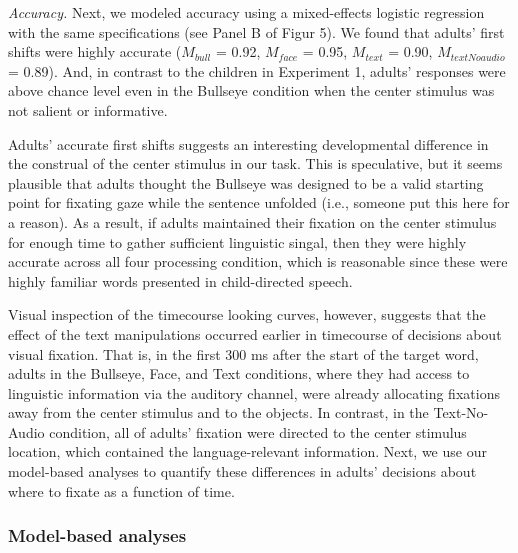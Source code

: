 \documentclass[english,floatsintext,man]{apa6}
\begin{document}
\emph{Accuracy.} Next, we modeled accuracy using a mixed-effects
logistic regression with the same specifications (see Panel B of Figur
5). We found that adults' first shifts were highly accurate
(\(M_{bull}\) = 0.92, \(M_{face}\) = 0.95, \(M_{text}\) = 0.90,
\(M_{textNoaudio}\) = 0.89). And, in contrast to the children in
Experiment 1, adults' responses were above chance level even in the
Bullseye condition when the center stimulus was not salient or
informative.

Adults' accurate first shifts suggests an interesting developmental
difference in the construal of the center stimulus in our task. This is
speculative, but it seems plausible that adults thought the Bullseye was
designed to be a valid starting point for fixating gaze while the
sentence unfolded (i.e., someone put this here for a reason). As a
result, if adults maintained their fixation on the center stimulus for
enough time to gather sufficient linguistic singal, then they were
highly accurate across all four processing condition, which is
reasonable since these were highly familiar words presented in
child-directed speech.

Visual inspection of the timecourse looking curves, however, suggests
that the effect of the text manipulations occurred earlier in timecourse
of decisions about visual fixation. That is, in the first 300 ms after
the start of the target word, adults in the Bullseye, Face, and Text
conditions, where they had access to linguistic information via the
auditory channel, were already allocating fixations away from the center
stimulus and to the objects. In contrast, in the Text-No-Audio
condition, all of adults' fixation were directed to the center stimulus
location, which contained the language-relevant information. Next, we
use our model-based analyses to quantify these differences in adults'
decisions about where to fixate as a function of time.

\hypertarget{model-based-analyses-1}{%
\subsubsection{Model-based analyses}\label{model-based-analyses-1}}
\end{document}
